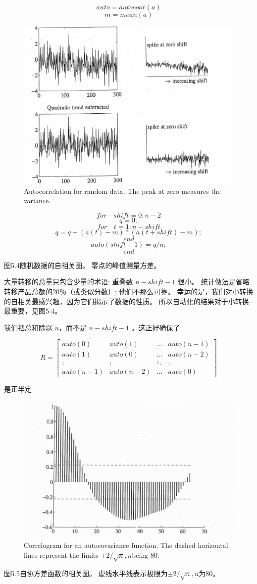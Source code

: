 \[ auto=autocoor(a) \]
\[ m=mean(a) \]
\begin{figure}[h]
	\centering
	\includegraphics[width=0.7\linewidth]{TeX_files/Part02/chapter05/image/4}
	\caption{Autocorrelation for random data. The peak at zero measures the variance.}
	\label{ }
\end{figure}

 \[ for \quad shift = 0:n-2 \]
\[ q=0 ;\]
\[ for\quad t=1:n-shift \]
\[ q=q+(a(t)-m)*(a(t+shift)-m); \]
\[ end \]
\[ auto(shift+1)=q/n ;\]
\[ end \]


图5.4随机数据的自相关图。 零点的峰值测量方差。

大量转移的总量只包含少量的术语; 重叠数 $ n-shift-1 $ 很小。 统计做法是省略转移产品总额的20％（或类似分数）; 他们不那么可靠。 幸运的是，我们对小转换的自相关最感兴趣，因为它们揭示了数据的性质。 所以自动化的结果对于小转换最重要，见图5.4。

我们把总和除以 $  n $，而不是  $ n-shift-1 $ 。这正好确保了

 \begin{equation}\label{5.34}
R=\begin{bmatrix}
auto(0)&auto(1)&...&auto(n-1)\\auto(1)&auto(0)&...&auto(n-2)\\ \colon&\colon&\ddots&\colon\\auto(n-1)&auto(n-2)&...&auto(0)
\end{bmatrix}
\end{equation}

是正半定

\begin{figure}[h]
	\centering
	\includegraphics[width=0.7\linewidth]{TeX_files/Part02/chapter05/image/5}
	\caption{Correlogram for an autocovariance function. The dashed horizontal lines represent the limits $ \pm2/\sqrt{n},n $being 80.}
	\label{ }
\end{figure}
图5.5自协方差函数的相关图。 虚线水平线表示极限为$ \pm2/\sqrt{n},n $为80。
